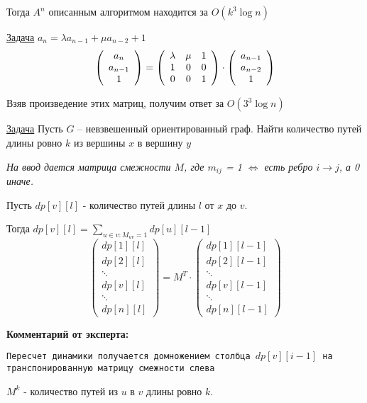 Тогда $A^n$ описанным алгоритмом находится за $O(k^3 \log{n})$

 \underline{Задача} $a_n = \lambda a_{n - 1} + \mu a_{n-2} + 1$
$$\left(\begin{array}{c}
  a_n \\
  a_{n-1} \\
  1
\end{array}\right) = \left(\begin{array}{c c c}
  \lambda & \mu & 1 \\
  1 & 0 & 0\\
  0 & 0 & 1
\end{array}\right) \cdot \left(\begin{array}{c c c}
  a_{n-1} \\
  a_{n-2} \\
  1
\end{array}\right)$$

Взяв произведение этих матриц, получим ответ за $O(3^3 \log{n})$

 \underline{Задача} Пусть $G$ -- невзвешенный ориентированный граф. Найти количество путей длины ровно \(k\) из вершины $x$ в вершину $y$ 
 
 \textit{На ввод дается матрица смежности $M$, где $m_{ij}$ = 1 $\Leftrightarrow$ есть ребро $i \to j$, а 0 иначе.}

 Пусть $dp[v][l]$ - количество путей длины $l$ от $x$ до $v$.

 Тогда $dp[v][l] = \sum_{u \in v: M_{uv} = 1} dp[u][l - 1]$
 $$\left(\begin{array}{c}
  dp[1][l]\\
  dp[2][l] \\
  \ddots \\
  dp[v][l]\\
  \ddots\\
  dp[n][l]
 \end{array}\right) = M^T \cdot \left(\begin{array}{c}
  dp[1][l - 1]\\
  dp[2][l - 1] \\
  \ddots \\
  dp[v][l - 1]\\
  \ddots\\
  dp[n][l - 1]
 \end{array}\right)$$

\textbf{Комментарий от эксперта:}

\texttt{Пересчет динамики получается домножением столбца $dp[v][i-1]$ на транспонированную матрицу смежности слева}
\begin{proposition}
  $M^k$ - количество путей из $u$ в $v$ длины ровно $k$.
\end{proposition}

